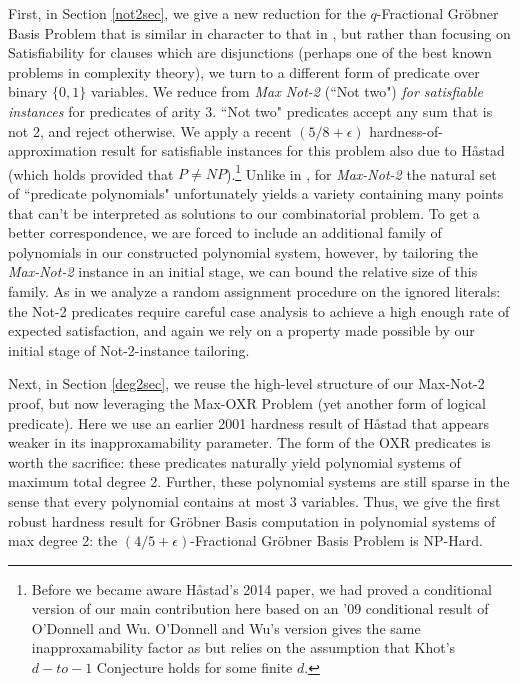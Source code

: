 \documentclass{article}
\begin{document}
First, in Section \ref{not2sec}, we give a
new reduction for the $q$-Fractional Gr\"{o}bner Basis Problem  that is similar in character to that in \citep{RS}, but rather than focusing on Satisfiability for clauses which are disjunctions
(perhaps one of the best known problems in complexity theory),
we turn to a different form of predicate over binary $\{0,1\}$ variables. We reduce from \textit{Max Not-2} (``Not two") \textit{for satisfiable instances} for predicates of arity 3. ``Not two" predicates accept any sum that is not 2, and reject otherwise. We apply a recent $(5/8+\epsilon)$ hardness-of-approximation result for satisfiable instances for this problem also due to H{\aa}stad (which holds
provided that $P\neq NP$).\footnote{Before we became aware H{\aa}stad's 2014 paper, we had proved a conditional version of our main contribution here based on an '09 conditional result of O'Donnell and Wu.  O'Donnell and Wu's version gives the same inapproxamability factor as \citep{hast14} but relies on the assumption that Khot's $d-to-1$ Conjecture holds for some finite $d$.}
Unlike in \citep{RS}, for \textit{Max-Not-2} the natural set of ``predicate polynomials" unfortunately yields a variety containing many points that can't be interpreted as solutions to our combinatorial problem. To get a better correspondence, we are forced to include an additional family of polynomials in our constructed polynomial system, however, by tailoring the \textit{Max-Not-2} instance in an initial stage, we can bound the relative size of this family. As in \citep{RS} we analyze a random assignment procedure on the ignored literals: the Not-2 predicates require careful case analysis to achieve a high enough rate of expected satisfaction, and again we rely on a property made possible by our initial stage of Not-2-instance tailoring. 

Next, in Section \ref{deg2sec}, we reuse the high-level structure of our Max-Not-2 proof, but now leveraging the Max-OXR Problem (yet another form of logical predicate). Here we use an earlier 2001 hardness result of H{\aa}stad that appears weaker in its inapproxamability parameter. The form of the OXR predicates is worth the sacrifice: these predicates naturally yield polynomial systems of maximum total degree 2. Further, these polynomial systems are still sparse in the sense that every polynomial contains at most 3 variables. Thus, we give the first robust hardness result for Gr\"{o}bner Basis computation in polynomial systems of max degree 2: the $(4/5+\epsilon)$-Fractional Gr\"{o}bner Basis Problem is NP-Hard. 
\end{document}
